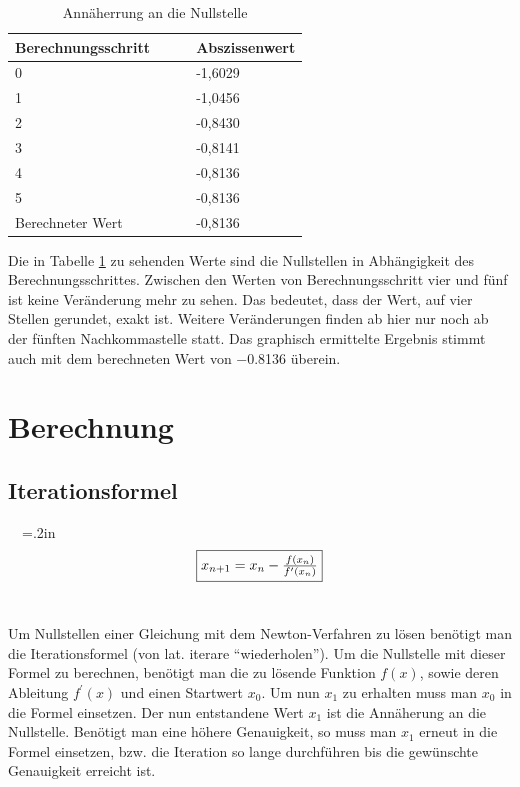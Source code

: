 \documentclass[a4paper,12pt,fleqn,oneside]{article}
\begin{document}
\FloatBarrier
		\begin{table}[]
			\centering
			\begin{tabular}{@{}ll@{}}
				\toprule
				Berechnungsschritt\ \ \ \ 		& Abszissenwert \\ \midrule
				0                  				& -1,6029       \\
				1                  				& -1,0456       \\
				2                  				& -0,8430       \\
				3                  				& -0,8141       \\
				4                  				& -0,8136       \\
				5                  				& -0,8136       \\
				Berechneter Wert   			& -0,8136       \\ \bottomrule
			\end{tabular}
			\caption{Annäherrung an die Nullstelle}
			\label{tab:nullstelle}
		\end{table}
		
\FloatBarrier
		
		\noindent
		Die in Tabelle \ref{tab:nullstelle} zu sehenden Werte sind die Nullstellen in Abhängigkeit des Berechnungsschrittes. Zwischen den Werten von
		Berechnungsschritt vier und fünf ist keine Veränderung mehr zu sehen. Das bedeutet, dass der Wert, auf vier Stellen gerundet, exakt ist.
		Weitere Veränderungen finden ab hier nur noch ab der fünften Nachkommastelle statt. Das graphisch ermittelte Ergebnis stimmt auch mit dem
		berechneten Wert von \num{-0.8136} überein.

\newpage

\section{Berechnung}
	\subsection{Iterationsformel}
		\ \ 
		{\fboxsep=.2in $$\framebox{$x_{n+1} = x_{n} - \frac{f(x_{n})}{f^\prime(x_{n})}$}$$}\ \ 
		 
		Um Nullstellen einer Gleichung mit dem Newton-Verfahren zu lösen benötigt man die Iterationsformel (von lat. iterare "`wiederholen"').
		Um die Nullstelle mit dieser Formel zu berechnen, benötigt man die zu lösende Funktion $f(x)$, sowie deren Ableitung $f^\prime(x)$ und einen
		Startwert $x_0$. Um nun $x_1$ zu erhalten muss man $x_0$ in die Formel einsetzen. Der nun entstandene Wert $x_1$ ist die Annäherung an
		die Nullstelle. Benötigt man eine höhere Genauigkeit, so muss man $x_1$ erneut in die Formel einsetzen, bzw. die Iteration so lange durchführen
		bis die gewünschte Genauigkeit erreicht ist.
\end{document}
